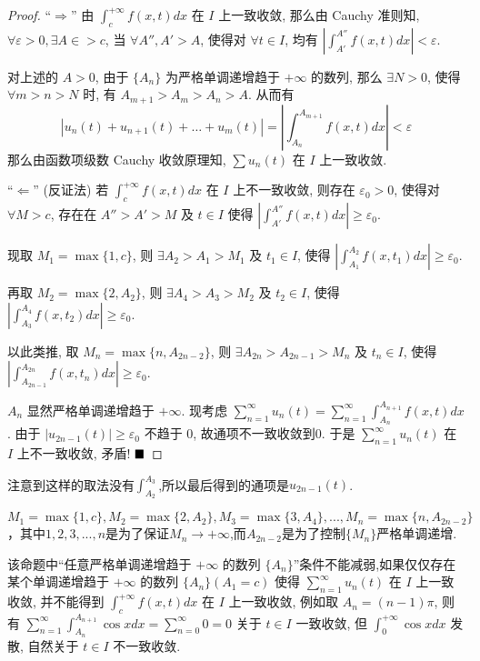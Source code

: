 \documentclass[lang=cn,newtx,10pt,scheme=chinese]{elegantbook}
\begin{document}
\begin{proof}
“$\Rightarrow$” 由 $\int_{c}^{+\infty} f(x, t) dx$ 在 $I$ 上一致收敛, 那么由 Cauchy 准则知, $\forall \varepsilon > 0, \exists A \in > c$, 当 $\forall A'', A' > A$, 使得对 $\forall t \in I$, 均有 $|\int_{A'}^{A''} f(x, t) dx| < \varepsilon$.

对上述的 $A>0$, 由于 $\{A_n\}$ 为严格单调递增趋于 $+\infty$ 的数列, 那么 $\exists N > 0$, 使得 $\forall m > n > N$ 时, 有 $A_{m+1} >  A_m > A_n > A$. 从而有
$$ |u_{n}(t) + u_{n+1}(t) + \dots + u_{m}(t)| = \left|\int_{A_n}^{A_{m+1}} f(x, t) dx\right| < \varepsilon $$
那么由函数项级数 Cauchy 收敛原理知, $\sum u_n(t)$ 在 $I$ 上一致收敛.

“$\Leftarrow$” (反证法)
若 $\int_{c}^{+\infty} f(x, t) dx$ 在 $I$ 上不一致收敛, 则存在 $\varepsilon_0 > 0$, 使得对 $\forall M > c$, 存在在 $A''>A'>M$ 及 $t \in I$ 使得 $|\int_{A'}^{A''} f(x, t) dx| \ge \varepsilon_0$.

现取 $M_1=\max \{1,c\}$, 则 $\exists A_2 > A_1 > M_1$ 及 $t_1 \in I$, 使得 $|\int_{A_1}^{A_2} f(x, t_1) dx| \ge \varepsilon_0$.

再取 $M_2 = \max\{2, A_2\}$, 则 $\exists A_4 > A_3 > M_2$ 及 $t_2 \in I$, 使得 $|\int_{A_3}^{A_4} f(x, t_2) dx| \ge \varepsilon_0$.

以此类推, 取 $M_n = \max\{n, A_{2n-2}\}$, 则 $\exists A_{2n} > A_{2n-1} > M_n$ 及 $t_n \in I$, 使得 $|\int_{A_{2n-1}}^{A_{2n}} f(x, t_n) dx| \ge \varepsilon_0$.

$A_n$ 显然严格单调递增趋于 $+\infty$. 现考虑 $\sum_{n=1}^{\infty} u_n(t) = \sum_{n=1}^{\infty} \int_{A_n}^{A_{n+1}} f(x, t) dx$. 由于 $|u_{2n-1}(t)| \ge \varepsilon_0$ 不趋于 0, 故通项不一致收敛到0. 于是 $\sum_{n=1}^{\infty} u_n(t)$ 在 $I$ 上不一致收敛, 矛盾!
$\hfill \blacksquare$
\end{proof}

\begin{remark}
    注意到这样的取法没有$\int_{A_2}^{A_3}$,所以最后得到的通项是$u_{2n-1}(t)$.

    $M_1 = \max\{1,c\},M_2 = \max\{2,A_2\},M_3 = \max\{3,A_4\}, ...,M_n = \max\{n,A_{2n-2}\}$，其中$1,2,3,...,n$是为了保证$M_n \to +\infty$,而$A_{2n-2}$是为了控制$\{M_n\}$严格单调递增.
\end{remark}

\begin{remark}
     该命题中“任意严格单调递增趋于 $+\infty$ 的数列 $\{A_n\}$”条件不能减弱,如果仅仅存在某个单调递增趋于 $+\infty$ 的数列 $\{A_n\}(A_1=c)$ 使得 $\sum_{n=1}^{\infty} u_n(t)$ 在 $I$ 上一致收敛, 并不能得到 $\int_{c}^{+\infty} f(x, t) dx$ 在 $I$ 上一致收敛, 
     例如取 $A_n = (n-1)\pi$, 则有 $\sum_{n=1}^{\infty} \int_{A_n}^{A_{n+1}} \cos x dx = \sum_{n=0}^{\infty} 0 = 0$ 关于 $t \in I$ 一致收敛, 但 $\int_{0}^{+\infty} \cos x dx$ 发散, 自然关于 $t \in I$ 不一致收敛.
\end{remark}
\end{document}
